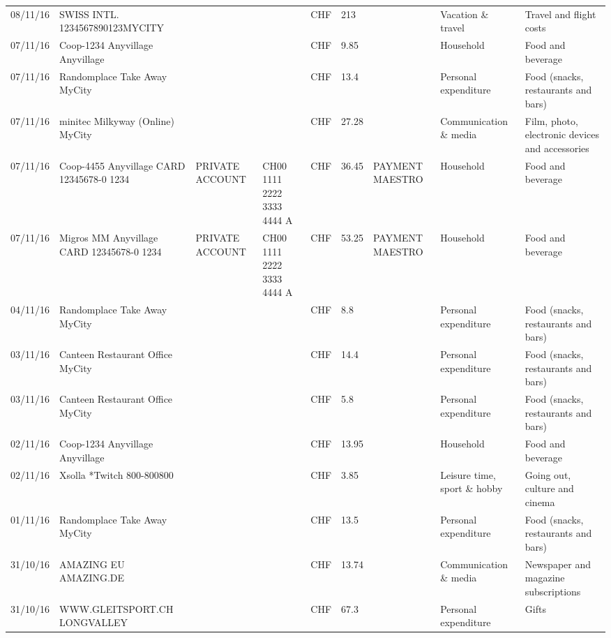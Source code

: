 \begin{landscape}
\begin{table}[t]
\begin{center}
\begin{tabular}{lllllllll}
		08/11/16 & SWISS INTL. 1234567890123MYCITY &       &       & CHF   & 213   &       & Vacation \& travel & Travel and flight costs \\
		07/11/16 & Coop-1234 Anyvillage    Anyvillage &       &       & CHF   & 9.85  &       & Household & Food and beverage \\
		07/11/16 & Randomplace Take Away     MyCity &       &       & CHF   & 13.4  &       & Personal expenditure & Food (snacks, restaurants and bars) \\
		07/11/16 & minitec Milkyway (Online) MyCity &       &       & CHF   & 27.28 &       & Communication \& media & Film, photo, electronic devices and accessories \\
		07/11/16 & Coop-4455 Anyvillage CARD 12345678-0 1234 & PRIVATE ACCOUNT & CH00 1111 2222 3333 4444 A & CHF   & 36.45 & PAYMENT MAESTRO & Household & Food and beverage \\
		07/11/16 & Migros MM Anyvillage CARD 12345678-0 1234 & PRIVATE ACCOUNT & CH00 1111 2222 3333 4444 A & CHF   & 53.25 & PAYMENT MAESTRO & Household & Food and beverage \\
		04/11/16 & Randomplace Take Away     MyCity &       &       & CHF   & 8.8   &       & Personal expenditure & Food (snacks, restaurants and bars) \\
		03/11/16 & Canteen Restaurant Office      MyCity &       &       & CHF   & 14.4  &       & Personal expenditure & Food (snacks, restaurants and bars) \\
		03/11/16 & Canteen Restaurant Office      MyCity &       &       & CHF   & 5.8   &       & Personal expenditure & Food (snacks, restaurants and bars) \\
		02/11/16 & Coop-1234 Anyvillage    Anyvillage &       &       & CHF   & 13.95 &       & Household & Food and beverage \\
		02/11/16 & Xsolla *Twitch           800-800800 &       &       & CHF   & 3.85  &       & Leisure time, sport \& hobby & Going out, culture and cinema \\
		01/11/16 & Randomplace Take Away     MyCity &       &       & CHF   & 13.5  &       & Personal expenditure & Food (snacks, restaurants and bars) \\
		31/10/16 & AMAZING EU                AMAZING.DE &       &       & CHF   & 13.74 &       & Communication \& media & Newspaper and magazine subscriptions \\
		31/10/16 & WWW.GLEITSPORT.CH         LONGVALLEY &       &       & CHF   & 67.3  &       & Personal expenditure & Gifts \\

\end{tabular}
\end{center}
\end{table}
\end{landscape}
